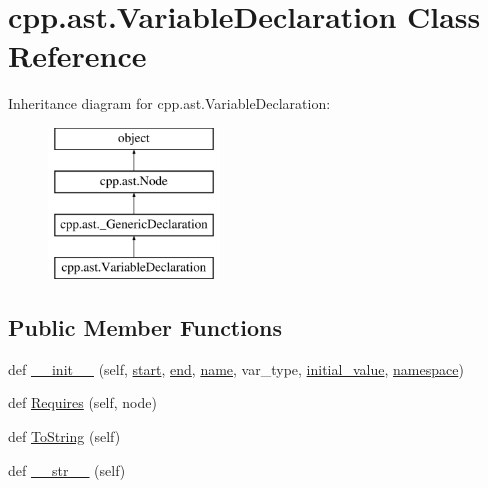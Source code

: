 \hypertarget{classcpp_1_1ast_1_1VariableDeclaration}{}\section{cpp.\+ast.\+Variable\+Declaration Class Reference}
\label{classcpp_1_1ast_1_1VariableDeclaration}
Inheritance diagram for cpp.\+ast.\+Variable\+Declaration\+:\begin{figure}[H]
\begin{center}
\leavevmode
\includegraphics[height=4.000000cm]{classcpp_1_1ast_1_1VariableDeclaration}
\end{center}
\end{figure}
\subsection*{Public Member Functions}
\begin{DoxyCompactItemize}
\item 
def \mbox{\hyperlink{classcpp_1_1ast_1_1VariableDeclaration_adc19909b6a3b2c2978b02044634fc13f}{\+\_\+\+\_\+init\+\_\+\+\_\+}} (self, \mbox{\hyperlink{classcpp_1_1ast_1_1Node_a7b2aa97e6a049bb1a93aea48c48f1f44}{start}}, \mbox{\hyperlink{classcpp_1_1ast_1_1Node_a3c5e5246ccf619df28eca02e29d69647}{end}}, \mbox{\hyperlink{classcpp_1_1ast_1_1__GenericDeclaration_af774f4729dfd78d0538a6782fe8514c1}{name}}, var\+\_\+type, \mbox{\hyperlink{classcpp_1_1ast_1_1VariableDeclaration_a7c259ca42a06e264679e8ab66e7ea374}{initial\+\_\+value}}, \mbox{\hyperlink{classcpp_1_1ast_1_1__GenericDeclaration_a8aee3f11b37449d54b42a78e0a689f46}{namespace}})
\item 
def \mbox{\hyperlink{classcpp_1_1ast_1_1VariableDeclaration_aaa1cae7cf191e6d561d861cd053a0bf4}{Requires}} (self, node)
\item 
def \mbox{\hyperlink{classcpp_1_1ast_1_1VariableDeclaration_a047aa4afddf7b7823a4095cea9477a21}{To\+String}} (self)
\item 
def \mbox{\hyperlink{classcpp_1_1ast_1_1VariableDeclaration_a9f5c15731d1bdd8fe14c2a575e2f4fe6}{\+\_\+\+\_\+str\+\_\+\+\_\+}} (self)
\end{DoxyCompactItemize}

